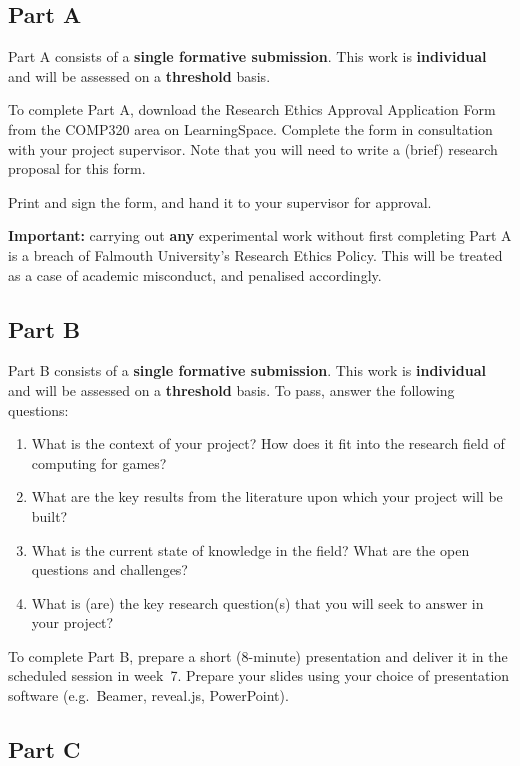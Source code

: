 \subsection*{Part A}

Part A consists of a \textbf{single formative submission}.
This work is \textbf{individual} and will be assessed on a \textbf{threshold} basis.

To complete Part A, download the Research Ethics Approval Application Form
from the COMP320 area on LearningSpace.
Complete the form in consultation with your project supervisor.
Note that you will need to write a (brief) research proposal for this form.

Print and sign the form, and hand it to your supervisor for approval.

\textbf{Important:} carrying out \textbf{any} experimental work
without first completing Part A is a breach of Falmouth University's Research Ethics Policy.
This will be treated as a case of academic misconduct, and penalised accordingly.

\subsection*{Part B}

Part B consists of a \textbf{single formative submission}.
This work is \textbf{individual} and will be assessed on a \textbf{threshold} basis.
To pass, answer the following questions:

\begin{enumerate}[label=(\roman*)]
	\item What is the context of your project? How does it fit into the
		research field of computing for games?
	\item What are the key results from the literature upon which your project will be built?
	\item What is the current state of knowledge in the field?
		What are the open questions and challenges?
	\item What is (are) the key research question(s) that you will seek to
		answer in your project?
\end{enumerate}

To complete Part B, prepare a short (8-minute) presentation 
and deliver it in the scheduled session in week~7.
Prepare your slides using your choice of presentation software
(e.g.\ Beamer, reveal.js, PowerPoint).

\subsection*{Part C}

